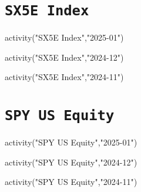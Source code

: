 \documentclass{article}
\begin{document}
\newpage
\section{\texttt{SX5E Index}}

\begin{pycode}
activity("SX5E Index","2025-01")
\end{pycode}

\begin{pycode}
activity("SX5E Index","2024-12")
\end{pycode}

\begin{pycode}
activity("SX5E Index","2024-11")
\end{pycode}

\newpage
\section{\texttt{SPY US Equity}}

\begin{pycode}
activity("SPY US Equity","2025-01")
\end{pycode}

\begin{pycode}
activity("SPY US Equity","2024-12")
\end{pycode}

\begin{pycode}
activity("SPY US Equity","2024-11")
\end{pycode}
\end{document}
